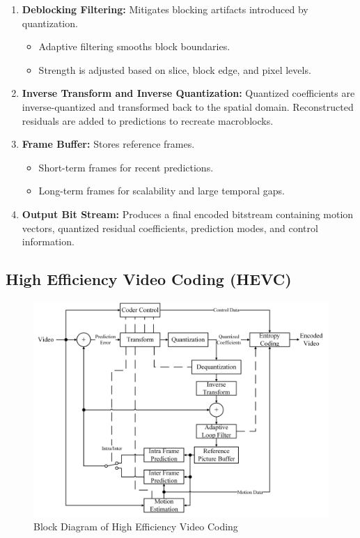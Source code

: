 \begin{enumerate}[label=\textbf{\roman*.}]
        \item \textbf{Deblocking Filtering:}  
        Mitigates blocking artifacts introduced by quantization.
        \begin{itemize}
            \item Adaptive filtering smooths block boundaries.
            \item Strength is adjusted based on slice, block edge, and pixel levels.
        \end{itemize}
    
        \item \textbf{Inverse Transform and Inverse Quantization:}  
        Quantized coefficients are inverse-quantized and transformed back to the spatial domain. Reconstructed residuals are added to predictions to recreate macroblocks.
    
        \item \textbf{Frame Buffer:}  
        Stores reference frames.
        \begin{itemize}
            \item Short-term frames for recent predictions.
            \item Long-term frames for scalability and large temporal gaps.
        \end{itemize}
    
        \item \textbf{Output Bit Stream:}  
        Produces a final encoded bitstream containing motion vectors, quantized residual coefficients, prediction modes, and control information.
    \end{enumerate}

    \subsection{High Efficiency Video Coding (HEVC)}
        \begin{figure}[H]
        \centering
        \includegraphics[width=0.95\linewidth]{assets/h265_blockdiagram.png}
        \caption{Block Diagram of High Efficiency Video Coding}
        \label{fig:hevc}
    \end{figure}

